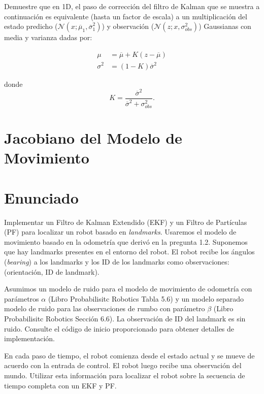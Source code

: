 \documentclass[tp]{lcc}
\begin{document}
    Demuestre que en 1D, el paso de corrección del filtro de Kalman que se muestra a continuación es equivalente (hasta un factor de escala) a un multiplicación del estado predicho ($\mathcal{N}(x;\overline{\mu}_{1},\overline{\sigma}_{1}^{2})$) y observación ($\mathcal{N}(z;x, \sigma_{obs}^{2})$) Gaussianas con media y varianza dadas por:
    
    \begin{align*}
        \mu &= \overline{\mu} + K (z - \overline{\mu})\\
        \sigma^{2} &= (1 - K) \overline{\sigma}^{2}
    \end{align*}

    donde 
    \begin{equation*}
        K = \dfrac{\overline{\sigma}^{2}}{\overline{\sigma}^{2}+\sigma_{obs}^{2}}.
    \end{equation*}
	
	\section{Jacobiano del Modelo de Movimiento}
	
	\section{Enunciado}
		
	Implementar un Filtro de Kalman Extendido (EKF) y un Filtro de Partículas (PF) para localizar un robot basado en \emph{landmarks}. Usaremos el modelo de movimiento basado en la odometría que derivó en la pregunta 1.2. Suponemos que hay landmarks presentes en el entorno del robot. El robot recibe los ángulos (\emph{bearing}) a los landmarks y los ID de los landmarks como observaciones: (orientación, ID de landmark).
	
	Asumimos un modelo de ruido para el modelo de movimiento de odometría con parámetros $\alpha$ (Libro Probabilisitc Robotics Tabla 5.6) y un modelo separado modelo de ruido para las observaciones de rumbo con parámetro $\beta$ (Libro Probabilisitc Robotics Sección 6.6). La observación de ID del landmark es sin ruido. Consulte el código de inicio proporcionado para obtener detalles de implementación.
	
	En cada paso de tiempo, el robot comienza desde el estado actual y se mueve de acuerdo con la entrada de control. El robot luego recibe una observación del mundo. Utilizar esta información para localizar el robot sobre la secuencia de tiempo completa con un EKF y PF.
	
\end{document}
